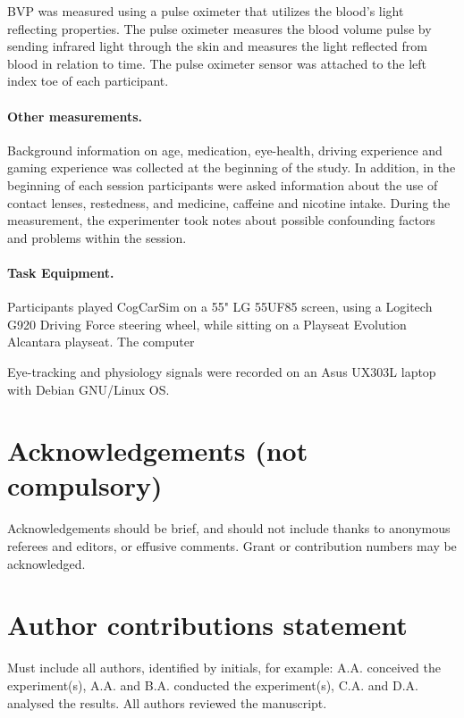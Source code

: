 \documentclass[fleqn,10pt]{wlscirep}
\begin{document}
BVP was measured using a pulse oximeter that utilizes the blood's light reflecting properties. The pulse oximeter measures the blood volume pulse by sending infrared light through the skin and measures the light reflected from blood in relation to time. The pulse oximeter sensor was attached to the left index toe of each participant.

\paragraph{Other measurements.} Background information on age, medication, eye-health, driving experience and gaming experience was collected at the beginning of the study. In addition, in the beginning of each session participants were asked information about the use of contact lenses, restedness, and medicine, caffeine and nicotine intake. During the measurement, the experimenter took notes about possible confounding factors and problems within the session.

\paragraph{Task Equipment.} Participants played CogCarSim on a 55" LG 55UF85 screen, using a Logitech G920 Driving Force steering wheel, while sitting on a Playseat Evolution Alcantara playseat. The computer %

Eye-tracking and physiology signals were recorded on an Asus UX303L laptop with Debian GNU/Linux OS.




\section*{Acknowledgements (not compulsory)}

Acknowledgements should be brief, and should not include thanks to anonymous referees and editors, or effusive comments. Grant or contribution numbers may be acknowledged.

\section*{Author contributions statement}

Must include all authors, identified by initials, for example:
A.A. conceived the experiment(s),  A.A. and B.A. conducted the experiment(s), C.A. and D.A. analysed the results.  All authors reviewed the manuscript.
\end{document}
